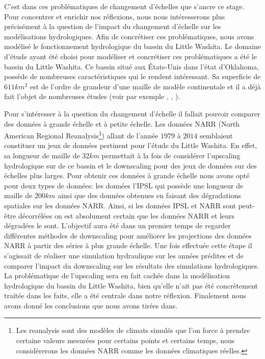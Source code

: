 \documentclass[a4paper,11pt]{article}
\numberwithin{equation}{section}
\begin{document}
C'est dans ces problématiques de changement d'échelles que s'ancre ce stage. Pour concentrer et enrichir nos réflexions, nous nous intéresserons plus précisément à la question de l'impact du changement d'échelle sur les modélisations hydrologiques. Afin de concrétiser ces problématiques, nous avons modélisé le fonctionnement hydrologique du bassin du Little Washita. 
Le domaine d'étude ayant été choisi pour modéliser et concrétiser ces problématiques a été le bassin du Little Washita. Ce bassin situé aux États-Unis dans l’état d’Oklahoma, possède de nombreuses caractéristiques qui le rendent intéressant. Sa superficie de $611km^2$ est de l'ordre de grandeur d'une maille de modèle continentale et il a déjà fait l'objet de nombreuses études (voir par exemple \cite{maxwell2007groundwater}, \cite{rosero2011ensemble}, \cite{maquin2016developpement}). 

\vspace{0.7cm}

Pour s'intéresser à la question du changement d'échelle il fallait pouvoir comparer des données à grande échelle et à petite échelle. Les données NARR (North American Regional Reanalysis\footnote{Les reanalysis sont des modèles de climats simulés que l'on force à prendre certaine valeurs mesurées pour certains points et certains temps, nous considérerons les données NARR comme les données climatiques réelles.}) allant de l'année $1979$ à $2014$ semblaient constituer un jeux de données pertinent pour l'étude du Little Washita. En effet, sa longueur de maille de $32km$ permettait à la fois de considérer l'upscaling hydrologique sur de ce bassin et le downscaling pour des jeux de données sur des échelles plus larges. Pour obtenir ces données à grande échelle nous avons opté pour deux types de données: les données l'IPSL qui possède une longueur de maille de $200km$ ainsi que des données obtenues en faisant des dégradations spatiales sur les données NARR. Ainsi, si les données IPSL et NARR sont peut-être décorrélées on est absolument certain que les données NARR et leurs dégradées le sont. L'objectif aura été dans un premier temps de regarder différentes méthodes de downscaling pour améliorer les projections des données NARR à partir des séries à plus grande échelle. Une fois effectuée cette étape il s'agissait de réaliser une simulation hydraulique sur les années prédites et de comparer l'impact du downscaling sur les résultats des simulations hydrologiques. La problématique de l'upscaling sera en fait cachée dans la modélisation hydrologique du bassin du Little Washita, bien qu'elle n'ait pas été concrètement traitée dans les faits, elle a été centrale dans notre réflexion. Finalement nous avons donné les conclusions que nous avons tirées dans.
\end{document}
